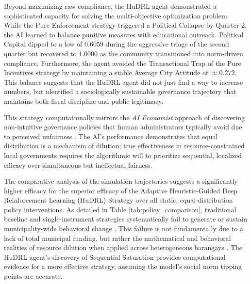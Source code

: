 Beyond maximizing raw compliance, the HuDRL agent demonstrated a sophisticated capacity for solving the multi-objective optimization problem. While the Pure Enforcement strategy triggered a Political Collapse by Quarter 2, the AI learned to balance punitive measures with educational outreach. Political Capital dipped to a low of 0.6059 during the aggressive triage of the second quarter but recovered to 1.0000 as the community transitioned into norm-driven compliance. Furthermore, the agent avoided the Transactional Trap of the Pure Incentives strategy by maintaining a stable Average City Attitude of $\approx 0.272$. This balance suggests that the HuDRL agent did not just find a way to increase numbers, but identified a sociologically sustainable governance trajectory that maintains both fiscal discipline and public legitimacy.

This strategy computationally mirrors the \textit{AI Economist} approach of discovering non-intuitive governance policies that human administrators typically avoid due to perceived unfairness \citep{ZhengAI2022}. The AI's performance demonstrates that equal distribution is a mechanism of dilution; true effectiveness in resource-constrained local governments requires the algorithmic will to prioritize sequential, localized efficacy over simultaneous but ineffectual fairness.

The comparative analysis of the simulation trajectories suggests a significantly higher efficacy for the superior efficacy of the Adaptive Heuristic-Guided Deep Reinforcement Learning (HuDRL) Strategy over all static, equal-distribution policy interventions. As detailed in Table \ref{tab:policy_comparison}, traditional baseline and single-instrument strategies systematically fail to generate or sustain municipality-wide behavioral change \citep{Nishimura2022}. This failure is not fundamentally due to a lack of total municipal funding, but rather the mathematical and behavioral realities of resource dilution when applied across heterogeneous barangays \citep{Alphonso2024, Badua2022}. The HuDRL agent’s discovery of Sequential Saturation provides computational evidence for a more effective strategy, assuming the model's social norm tipping points are accurate.

